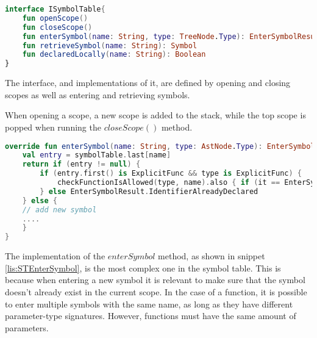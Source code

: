 \begin{lstlisting}[language=Kotlin,label=lis:STInterface,caption=The interface which all symbol table implementations must implement.]
interface ISymbolTable{
	fun openScope()
	fun closeScope()
	fun enterSymbol(name: String, type: TreeNode.Type): EnterSymbolResult
	fun retrieveSymbol(name: String): Symbol
	fun declaredLocally(name: String): Boolean
}
\end{lstlisting}
The interface, and implementations of it, are defined by opening and closing scopes as well as entering and retrieving symbols.

When opening a scope, a new scope is added to the stack, while the top scope is popped when running the $closeScope()$ method.

\begin{lstlisting}[language=Kotlin,label=lis:STEnterSymbol,caption=A simplified version of the enterSymbol implementation.]
override fun enterSymbol(name: String, type: AstNode.Type): EnterSymbolResult {
	val entry = symbolTable.last[name]
	return if (entry != null) {
		if (entry.first() is ExplicitFunc && type is ExplicitFunc) {
			checkFunctionIsAllowed(type, name).also { if (it == EnterSymbolResult.Success) entry.add(type) }
		} else EnterSymbolResult.IdentifierAlreadyDeclared
	} else {
	// add new symbol
	....
	}
}
\end{lstlisting}

The implementation of the $enterSymbol$ method, as shown in snippet \ref{lis:STEnterSymbol}, is the most complex one in the symbol table. 
This is because when entering a new symbol it is relevant to make sure that the symbol doesn't already exist in the current scope.
In the case of a function, it is possible to enter multiple symbols with the same name, as long as they have different parameter-type signatures. 
However, functions must have the same amount of parameters.
